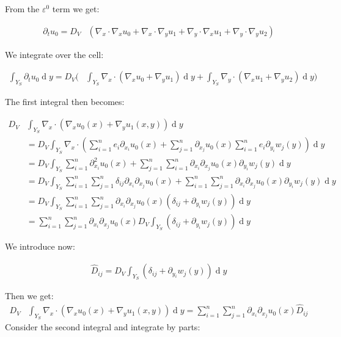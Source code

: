 \documentclass[10pt, a4paper]{article}
\begin{document}
 
 From the $\varepsilon^0$ term we get:
 
 \begin{align*}
 \partial_t u_0 = D_V & (\nabla_x \cdot \nabla_x u_0 + \nabla_x \cdot \nabla_y u_1 + \nabla_y \cdot \nabla_x u_1 + \nabla_y \cdot \nabla_y u_2)
 \end{align*}
 

 
 We integrate over the cell:
 
 \begin{align*}
 \int_{Y_S} \partial_t u_0 \operatorname{d} y = 
       D_V (& \int_{Y_S} \nabla_x \cdot (\nabla_x u_0 +    \nabla_y u_1) \operatorname{d} y 
       + \int_{Y_S} \nabla_y \cdot (\nabla_x u_1 + \nabla_y u_2) \operatorname{d} y )
 \end{align*}
 
  
 The first integral then becomes:
 
 \begin{align*}
 D_V &\int_{Y_S} \nabla_x \cdot (\nabla_x u_0(x) + \nabla_yu_1(x,y)) \operatorname{d}y \\
 &=  D_V \int_{Y_S} \nabla_x \cdot (\sum_{i=1}^n e_i \partial_{x_i} u_0(x) + \sum_{j=1}^n 
  \partial_{x_j} u_0(x) \sum_{i=1}^n e_i\partial_{y_i}w_j(y)) \operatorname{d} y\\
 &= D_V \int_{Y_S} \sum_{i=1}^n \partial_{x_i}^2 u_0(x) + \sum_{j=1}^n\sum_{i=1}^n 
 \partial_{x_i}\partial_{x_j}u_0(x) \partial_{y_i}w_j(y)\operatorname{d}y\\
 &= D_V \int_{Y_S} \sum_{i=1}^n\sum_{j=1}^n \delta_{ij}\partial_{x_i}\partial_{x_j}u_0(x)
 + \sum_{i=1}^n\sum_{j=1}^n \partial_{x_i}\partial_{x_j} u_0(x) \partial_{y_i}w_j(y)\operatorname{d}y\\
 &= D_V \int_{Y_S} \sum_{i=1}^n\sum_{j=1}^n\partial_{x_i}\partial_{x_j} u_0(x)
 (\delta_{ij} + \partial_{y_i} w_j(y))\operatorname{d}y\\
 &= \sum_{i=1}^n\sum_{j=1}^n\partial_{x_i}\partial_{x_j} u_0(x)
 D_V \int_{Y_S}(\delta_{ij} + \partial_{y_i} w_j(y))\operatorname{d}y
 \end{align*}
 
 We introduce now:
 
\begin{align}
\hat D_{ij} =D_V \int_{Y_S}(\delta_{ij} + \partial_{y_i} w_j(y))\operatorname{d}y
\end{align}
 
 Then we get:
 \begin{align}
 D_V &\int_{Y_S} \nabla_x \cdot (\nabla_x u_0(x) + \nabla_yu_1(x,y)) \operatorname{d}y 
 = \sum_{i=1}^n\sum_{j=1}^n \partial_{x_i}\partial_{x_j}u_0(x) \hat D_{ij}
 \end{align}
 Consider the second integral and integrate by parts:
 
\end{document}
